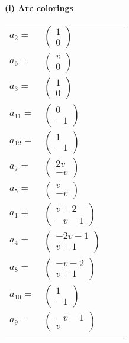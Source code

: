 \documentclass[1p]{elsarticle_modified}
\theoremstyle{definition}
\begin{document}
\flushleft \textbf{(i) Arc colorings}\\
\begin{tabular}{m{7pt} m{180pt} m{7pt} m{180pt} }
\flushright $a_{2}=$&$\begin{pmatrix}1\\0\end{pmatrix}$ \\
\flushright $a_{6}=$&$\begin{pmatrix}v\\0\end{pmatrix}$ \\
\flushright $a_{3}=$&$\begin{pmatrix}1\\0\end{pmatrix}$ \\
\flushright $a_{11}=$&$\begin{pmatrix}0\\-1\end{pmatrix}$ \\
\flushright $a_{12}=$&$\begin{pmatrix}1\\-1\end{pmatrix}$ \\
\flushright $a_{7}=$&$\begin{pmatrix}2 v\\- v\end{pmatrix}$ \\
\flushright $a_{5}=$&$\begin{pmatrix}v\\- v\end{pmatrix}$ \\
\flushright $a_{1}=$&$\begin{pmatrix}v+2\\- v-1\end{pmatrix}$ \\
\flushright $a_{4}=$&$\begin{pmatrix}-2 v-1\\v+1\end{pmatrix}$ \\
\flushright $a_{8}=$&$\begin{pmatrix}- v-2\\v+1\end{pmatrix}$ \\
\flushright $a_{10}=$&$\begin{pmatrix}1\\-1\end{pmatrix}$ \\
\flushright $a_{9}=$&$\begin{pmatrix}- v-1\\v\end{pmatrix}$\\&\end{tabular}
\end{document}

